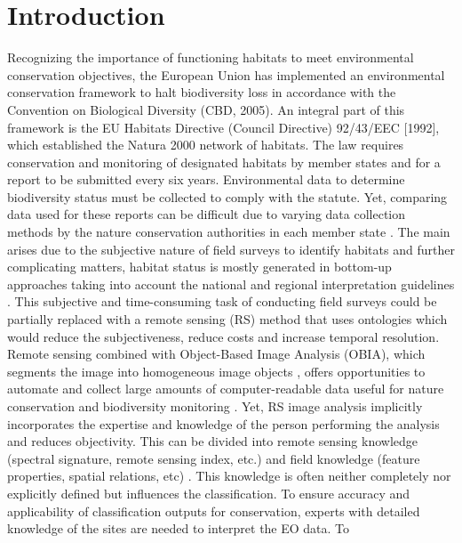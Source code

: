 \documentclass[authoryear, review,12pt,number]{elsarticle}
\begin{document}
\section{Introduction}  %
Recognizing the importance of functioning habitats to meet environmental
conservation objectives, the European Union has implemented an environmental
conservation framework to halt biodiversity loss in accordance with the
Convention on Biological Diversity (CBD, 2005). An integral part of this
framework is the EU Habitats Directive (Council Directive) 92/43/EEC [1992],
which established the Natura 2000 network of habitats. The law requires
conservation and monitoring of designated habitats by member states and for a
report to be submitted every six years. Environmental data to determine
biodiversity status must be collected to comply with the statute. Yet, comparing
data used for these reports can be difficult due to varying data collection
methods by the nature conservation authorities in each member state
\citep{INSPIREdataspecs, INSPIRE}. The main arises due to the subjective
nature of field surveys to identify habitats \citep{Cherrill1999, Cherrill1999a,
Nieland2015} and further complicating matters, habitat status is
mostly generated in bottom-up approaches taking into account the national and
regional interpretation guidelines \citep{INSPIREdataspecs}. This subjective
and time-consuming task of conducting field surveys could be partially replaced
with a remote sensing (RS) method that uses ontologies which would reduce the
subjectiveness, reduce costs and increase temporal resolution.
\\
Remote sensing combined with Object-Based Image Analysis (OBIA), which
segments the image into homogeneous image objects \citep{Blaschke2010}, offers
opportunities to automate and collect large amounts of computer-readable data
useful for nature conservation and biodiversity monitoring \citep{Corbane2015,
VandenBorre2011, Mayer2011}. Yet, RS image analysis implicitly incorporates the
expertise and knowledge of the person performing the analysis and reduces
objectivity. This can be divided into remote sensing knowledge (spectral
signature, remote sensing index, etc.) and field knowledge (feature properties,
spatial relations, etc) \citep{Andres2013a}. This knowledge is often neither
completely nor explicitly defined but influences the classification. To ensure
accuracy and applicability of classification outputs for conservation, experts
with detailed knowledge of the sites are needed to interpret the EO data. To
\end{document}
